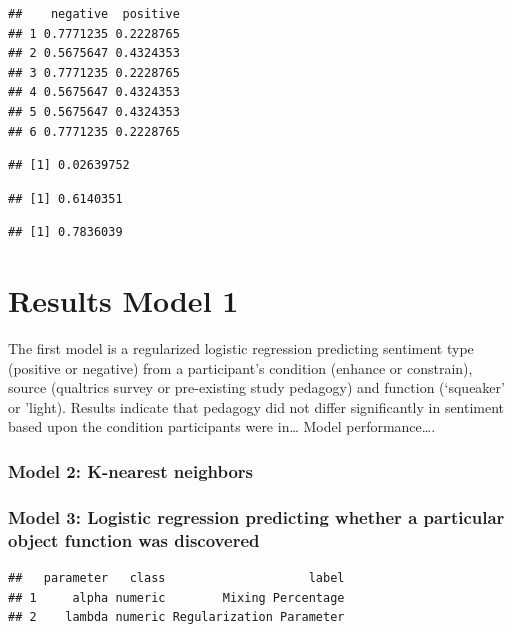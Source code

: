 \documentclass[
  english,
  man]{apa6}
\begin{document}
\begin{verbatim}
##    negative  positive
## 1 0.7771235 0.2228765
## 2 0.5675647 0.4324353
## 3 0.7771235 0.2228765
## 4 0.5675647 0.4324353
## 5 0.5675647 0.4324353
## 6 0.7771235 0.2228765
\end{verbatim}

\begin{verbatim}
## [1] 0.02639752
\end{verbatim}

\begin{verbatim}
## [1] 0.6140351
\end{verbatim}

\begin{verbatim}
## [1] 0.7836039
\end{verbatim}

\hypertarget{results-model-1}{%
\section{Results Model 1}\label{results-model-1}}

The first model is a regularized logistic regression predicting sentiment type (positive or negative) from a participant's condition (enhance or constrain), source (qualtrics survey or pre-existing study pedagogy) and function (`squeaker' or 'light). Results indicate that pedagogy did not differ significantly in sentiment based upon the condition participants were in\ldots{} Model performance\ldots.

\hypertarget{model-2-k-nearest-neighbors}{%
\subsubsection{Model 2: K-nearest neighbors}\label{model-2-k-nearest-neighbors}}

\hypertarget{model-3-logistic-regression-predicting-whether-a-particular-object-function-was-discovered}{%
\subsubsection{Model 3: Logistic regression predicting whether a particular object function was discovered}\label{model-3-logistic-regression-predicting-whether-a-particular-object-function-was-discovered}}

\begin{verbatim}
##   parameter   class                    label
## 1     alpha numeric        Mixing Percentage
## 2    lambda numeric Regularization Parameter
\end{verbatim}
\end{document}
